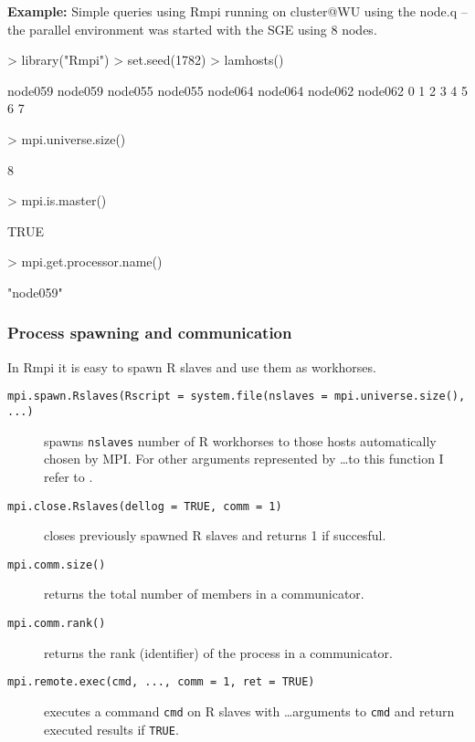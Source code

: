 \textbf{Example:} Simple queries using Rmpi \newline
running on cluster@WU using the node.q -- the parallel environment was
started with the SGE using 8 nodes.

\begin{Schunk}
\begin{Sinput}
> library("Rmpi")
> set.seed(1782)
> lamhosts()
\end{Sinput}
\begin{Soutput}
node059 node059 node055 node055 node064 node064 node062 node062 
      0       1       2       3       4       5       6       7 
\end{Soutput}
\begin{Sinput}
> mpi.universe.size()
\end{Sinput}
\begin{Soutput}
[1] 8
\end{Soutput}
\begin{Sinput}
> mpi.is.master()
\end{Sinput}
\begin{Soutput}
[1] TRUE
\end{Soutput}
\begin{Sinput}
> mpi.get.processor.name()
\end{Sinput}
\begin{Soutput}
[1] "node059"
\end{Soutput}
\end{Schunk}

\subsubsection{Process spawning and communication}

In Rmpi it is easy to spawn R slaves and use them as workhorses.


\begin{description}

\item[\texttt{mpi.spawn.Rslaves(Rscript =
    system.file(nslaves =
    mpi.universe.size(), ...)}] spawns \texttt{nslaves} number of R
  workhorses to those hosts automatically chosen by MPI. For other
  arguments represented by \ldots to this function I refer to
  \cite{yu06Rmpi}.
\item[\texttt{mpi.close.Rslaves(dellog = TRUE, comm = 1)}] closes
  previously spawned R slaves and returns 1 if succesful.
\item[\texttt{mpi.comm.size()}] returns the total number of members in
  a communicator.
\item[\texttt{mpi.comm.rank()}] returns the rank (identifier) of the
  process in a communicator.
\item[\texttt{mpi.remote.exec(cmd, ..., comm = 1, ret = TRUE)}]
  executes a command \texttt{cmd} on R slaves with \ldots arguments to
  \texttt{cmd} and return executed results if \texttt{TRUE}.
\end{description}

